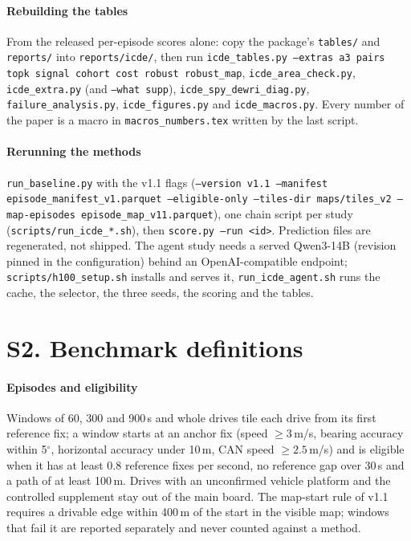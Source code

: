 \documentclass[conference]{IEEEtran}
\begin{document}
\paragraph{Rebuilding the tables} From the released per-episode scores alone: copy the package's \texttt{tables/} and
\texttt{reports/} into \texttt{reports/icde/}, then run \texttt{icde\_tables.py --extras a3 pairs topk signal cohort cost
robust robust\_map}, \texttt{icde\_area\_check.py}, \texttt{icde\_extra.py} (and \texttt{--what supp}),
\texttt{icde\_spy\_dewri\_diag.py}, \texttt{failure\_analysis.py}, \texttt{icde\_figures.py} and \texttt{icde\_macros.py}.
Every number of the paper is a macro in \texttt{macros\_numbers.tex} written by the last script.

\paragraph{Rerunning the methods} \texttt{run\_baseline.py} with the v1.1 flags (\texttt{--version v1.1 --manifest
episode\_manifest\_v1.parquet --eligible-only --tiles-dir maps/tiles\_v2 --map-episodes episode\_map\_v11.parquet}),
one chain script per study (\texttt{scripts/run\_icde\_*.sh}), then \texttt{score.py --run <id>}. Prediction files are
regenerated, not shipped. The agent study needs a served Qwen3-14B (revision pinned in the configuration) behind an
OpenAI-compatible endpoint; \texttt{scripts/h100\_setup.sh} installs and serves it, \texttt{run\_icde\_agent.sh} runs
the cache, the selector, the three seeds, the scoring and the tables.


\section{S2. Benchmark definitions}\label{sec:problem}
\paragraph{Episodes and eligibility} Windows of 60, 300 and 900\,s and whole drives tile each drive from its first
reference fix; a window starts at an anchor fix (speed $\ge 3$\,m/s, bearing accuracy within 5$^\circ$, horizontal
accuracy under 10\,m, CAN speed $\ge 2.5$\,m/s) and is eligible when it has at least 0.8 reference fixes per second, no
reference gap over 30\,s and a path of at least 100\,m. Drives with an unconfirmed vehicle platform and the controlled
supplement stay out of the main board. The map-start rule of v1.1 requires a drivable edge within 400\,m of the start
in the visible map; windows that fail it are reported separately and never counted against a method.
\end{document}
